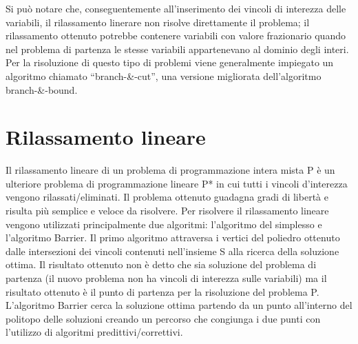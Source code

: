 \documentclass[12pt,a4paper,twoside,openright]{book}
\begin{document}
Si può notare che, conseguentemente all’inserimento dei vincoli di interezza delle variabili,
il rilassamento linerare non risolve direttamente il problema; il rilassamento ottenuto potrebbe contenere variabili con valore frazionario
quando nel problema di partenza le stesse variabili appartenevano al dominio degli interi.
Per la risoluzione di questo tipo di problemi viene generalmente impiegato un algoritmo 
chiamato “branch-\&-cut”, una versione migliorata dell’algoritmo branch-\&-bound.

\section{Rilassamento lineare}
Il rilassamento lineare di un problema di programmazione intera mista P è un ulteriore problema di programmazione lineare P* in cui
tutti i vincoli d'interezza vengono rilassati/eliminati. Il problema ottenuto guadagna gradi di libertà e risulta più semplice e veloce da risolvere. Per risolvere il rilassamento lineare vengono utilizzati principalmente due algoritmi: 
l'algoritmo del simplesso e l'algoritmo Barrier. Il primo algoritmo attraversa i vertici del poliedro ottenuto dalle intersezioni 
dei vincoli contenuti nell'insieme S alla ricerca della soluzione ottima. Il risultato ottenuto non 
è detto che sia soluzione del problema di partenza (il nuovo problema non ha vincoli di interezza sulle 
variabili) ma il risultato ottenuto è il punto di partenza per la risoluzione del problema P. 
L'algoritmo Barrier cerca la soluzione ottima partendo da un punto all'interno del politopo delle soluzioni 
creando un percorso che congiunga i due punti con l'utilizzo di algoritmi predittivi/correttivi. 
    
\end{document}
